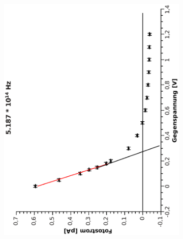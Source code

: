 \documentclass{article}
\begin{document}
\begin{figure}
\centering
\begin{subfigure}{0.45\textwidth}
\includegraphics[width=\textwidth, angle=-90]{5187.eps}
\end{subfigure}
\hfill	
\begin{subfigure}{0.45\textwidth}

\end{subfigure}
\end{figure}
\end{document}
